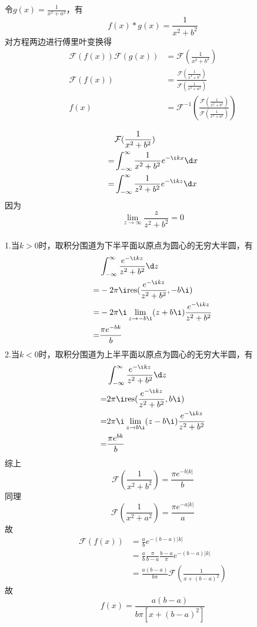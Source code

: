 \documentclass{phyasgn}
\newcommand{\res}{\text{res}}
\newcommand{\F}{\mathcal{F}}
\begin{document}
\begin{sol}[3]
    令$g(x)=\frac{1}{x^2+a^2}$，有
    $$f(x)*g(x)=\frac{1}{x^2+b^2}$$
    对方程两边进行傅里叶变换得
    \begin{align*}
        \F(f(x))\F(g(x))&=\F(\frac{1}{x^2+b^2})\\
        \F(f(x))&=\frac{\F(\frac{1}{x^2+b^2})}{\F(\frac{1}{x^2+a^2})}\\
        f(x)&=\F^{-1}(\frac{\F(\frac{1}{x^2+b^2})}{\F(\frac{1}{x^2+a^2})})\\
    \end{align*}
    \begin{align*}
        &\F(\frac{1}{x^2+b^2})\\
        =&\int_{-\infty}^{\infty}\frac{1}{x^2+b^2}e^{-\i kx}\d x\\
        =&\int_{-\infty}^{\infty}\frac{1}{z^2+b^2}e^{-\i kz}\d x\\
    \end{align*}
    因为
    $$\lim_{z\to\infty}\frac{z}{z^2+b^2}=0$$\\
    1.当$k>0$时，取积分围道为下半平面以原点为圆心的无穷大半圆，有
    \begin{align*}
        &\int_{-\infty}^{\infty}\frac{e^{-\i kz}}{z^2+b^2}\d z\\
        =&-2\pi \i\res(\frac{e^{-\i kz}}{z^2+b^2},-b\i)\\
        =&-2\pi \i\lim_{z\to-b\i}(z+b\i)\frac{e^{-\i kz}}{z^2+b^2}\\
        =&\frac{\pi e^{-bk}}{b}
    \end{align*}
    2.当$k<0$时，取积分围道为上半平面以原点为圆心的无穷大半圆，有
    \begin{align*}
        &\int_{-\infty}^{\infty}\frac{e^{-\i kz}}{z^2+b^2}\d z\\
        =&2\pi \i\res(\frac{e^{-\i kz}}{z^2+b^2},b\i)\\
        =&2\pi \i\lim_{z\to b\i}(z-b\i)\frac{e^{-\i kz}}{z^2+b^2}\\
        =&\frac{\pi e^{bk}}{b}
    \end{align*}
    综上
    $$\F(\frac{1}{x^2+b^2})=\frac{\pi e^{-b|k|}}{b}$$
    同理$$\F(\frac{1}{x^2+a^2})=\frac{\pi e^{-a|k|}}{a}$$
    故
    \begin{align*}
        \F(f(x))&=\frac{a}{b}e^{-(b-a)|k|}\\
        &=\frac{a}{b}\frac{\pi}{b-a}\frac{b-a}{\pi}e^{-(b-a)|k|}\\
        &=\frac{a(b-a)}{b\pi}\F(\frac{1}{x+(b-a)^2})
    \end{align*}
    故
    $$f(x)=\frac{a(b-a)}{b\pi[x+(b-a)^2]}$$
\end{sol}\par
\end{document}
